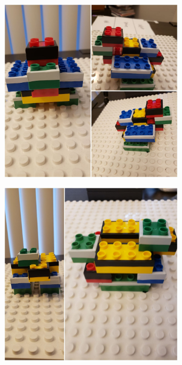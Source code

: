 \begin{figure}[H]
\begin{subfigure}{0.5\textwidth}
       \caption[{}]{\label{fig:fig_3-7b}}
    \end{subfigure}
    \begin{subfigure}{0.5\textwidth}
       \centering
       \includegraphics[width=0.8\linewidth]{figures/e5.jpg}
      
       \caption[{}]{ \label{fig:fig_3-7c}}
    \end{subfigure}
    \begin{subfigure}{0.5\textwidth}
       \centering
       \includegraphics[width=0.8\linewidth]{figures/e6.jpg}
       

\end{subfigure}
\end{figure}
